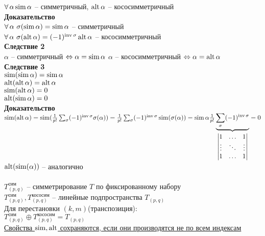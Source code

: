 \documentclass[12pt]{article}
\begin{document}
$\fall \alpha \Sim \alpha$ -- симметричный, $\alt \alpha$ -- кососимметричный\\
\textbf{Доказательство}\\
$\fall \alpha\ \sigma(\Sim \alpha) = \Sim \alpha$ -- симметричный\\
$\fall \alpha\ \sigma(\alt \alpha) = (-1)^{\inv \sigma} \alt \alpha$ -- кососимметричный\\
\textbf{Следствие 2}\\
$\alpha$ -- симметричный $\LRto \alpha = \Sim \alpha$
$\alpha$ -- кососимметричный $\LRto \alpha = \alt \alpha$\\
\textbf{Следствие 3}\\
$\Sim (\Sim \alpha) = \Sim \alpha$\\
$\alt (\alt \alpha) = \alt \alpha$\\
$\Sim (\alt \alpha) = 0$\\
$\alt (\Sim \alpha) = 0$\\
\textbf{Доказательство}\\
$\Sim (\alt \alpha) = \Sim (\frac1{p!}\sum_{\sigma} (-1)^{\inv \sigma} \sigma(\alpha)) = \frac1{p!} \sum_\sigma (-1)^{\inv \sigma} \Sim (\sigma(\alpha)) = \Sim \alpha \frac1{p!} \ub{\begin{vmatrix}
    1 & \ldots & 1\\
    \vdots & \ddots & \vdots\\
    1 & \ldots & 1
\end{vmatrix}}{\sum_\sigma (-1)^{\inv \sigma}} = 0$\\
$\alt (\Sim (\alpha))$ -- аналогично\\\\
$T^{\text{сим}}_{(p,q)}$ -- симметрирование $T$ по фиксированному набору\\
$T^{\text{сим}}_{(p,q)}, T^{\text{кососим}}_{(p,q)}$ -- линейные подпространства $T_{(p,q)}$\\
Для перестановки $(k,m)$(транспозиция):\\
$T^{\text{сим}}_{(p,q)} \oplus T^{\text{кососим}}_{(p,q)} = T_{(p,q)}$\\
\ul{Свойства $\Sim, \alt$ сохраняются, если они производятся не по всем индексам}
\end{document}
